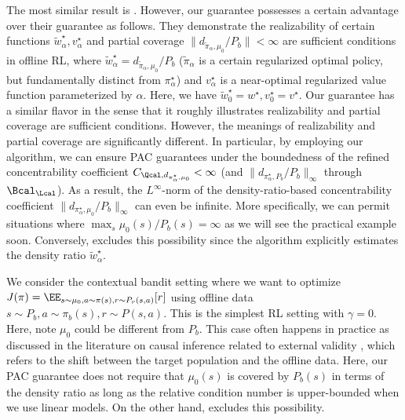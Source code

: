 The most similar result is \citet{zhan2022offline}. However, our guarantee possesses a certain advantage over their guarantee as follows. They demonstrate the realizability of certain functions $\tilde w^{\star}_{\alpha},v^{\star}_{\alpha}$ and partial coverage $\|d_{\tilde\pi_{\alpha},\mu_0}/P_b\|< \infty$ are sufficient conditions in offline RL, where $\tilde w^{\star}_{\alpha}=d_{\tilde\pi_{\alpha},\mu_0}/P_b$ ($\tilde\pi_{\alpha}$ is a certain regularized optimal policy, but fundamentally distinct from $\pi^{\star}_{\alpha}$) and $v^{\star}_{\alpha}$ is a near-optimal regularized value function parameterized by $\alpha$. Here, we have  $\tilde w^{\star}_{0}=w^{\star},v^{\star}_{0}=v^{\star}$. Our guarantee has a similar flavor in the sense that it roughly illustrates realizability and partial coverage are sufficient conditions. 
However, the meanings of realizability and partial coverage are significantly different. In particular, by employing our algorithm, we can ensure PAC guarantees under the boundedness of the refined concentrability coefficient $C_{\Qcal,d_{\pi^{\star}_{\alpha},\mu_0}}<\infty$ (and $\|d_{\pi^{\star}_{\alpha},P_b}/P_b\|_{\infty}$ through $\Bcal_{\Lcal}$). 
As a result, the $L^{\infty}$-norm of the density-ratio-based concentrability coefficient $\|d_{\pi^{\star}_{\alpha},\mu_0}/P_b\|_{\infty}$ can even be infinite. More specifically, we can permit situations where $\max_{s}\mu_0(s)/P_b(s)=\infty$ as we will see the practical example soon. Conversely, \citet{zhan2022offline} excludes this possibility since the algorithm explicitly estimates the density ratio $\tilde w^{\star}_{\alpha}$. 


















\begin{example}
 \label{exa:external}
 We consider the contextual bandit setting where we want to optimize $J(\pi)=\EE_{s\sim \mu_0,a\sim \pi(s),r\sim P_r(s,a)}[r]$ using offline data $s \sim P_b,a\sim \pi_b(s),r\sim P(s,a)$. This is the simplest RL setting with $\gamma=0$. Here, note $\mu_0$ could be different from $P_b$. This case often happens in practice as discussed in the literature on causal inference related to external validity \citep{pearl2022external,dahabreh2019generalizing,uehara2020off}, which refers to the shift between the target population and the offline data. Here, our PAC guarantee does not require that $\mu_0(s)$ is covered by $P_b(s)$ in terms of the density ratio as long as the relative condition number is upper-bounded when we use linear models. On the other hand, \citet{zhan2022offline} excludes this possibility.  
\end{example}

